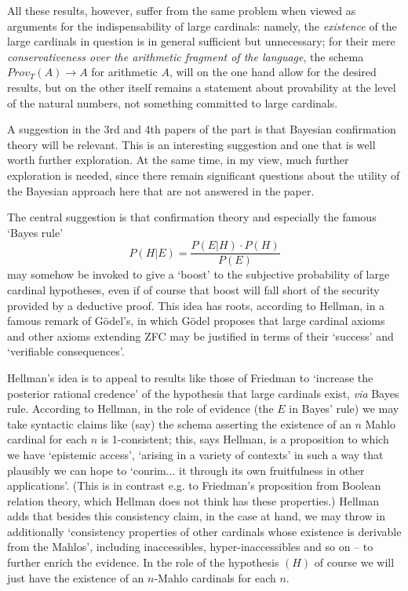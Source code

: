 \documentclass{asl}
\theoremstyle{definition}
\begin{document}
All these results, however, suffer from the same problem when viewed as arguments for the indispensability of large cardinals: namely, the \emph{existence} of the large cardinals in question is in general sufficient but unnecessary; for their mere \emph{conservativeness over the arithmetic fragment of the language}, the schema $Prov_T(A) \rightarrow A$ for arithmetic $A$, will on the one hand allow for the desired results, but on the other itself remains a statement about provability at the level of the natural numbers, not something committed to large cardinals.

A suggestion in the 3rd and 4th papers of the part is that Bayesian confirmation 
theory will be relevant. This is an interesting suggestion and one that is
 well worth further exploration. At the same time, in my view, 
 much further exploration is needed, since there remain significant 
 questions about the utility of the Bayesian approach here that are 
 not answered in the paper.

The central suggestion is that confirmation theory and especially the 
famous `Bayes rule'
\begin{equation}
P(H|E) = \frac{P(E|H)\cdot P(H)}{P(E)}
\end{equation}
may somehow be invoked to give a `boost' to the subjective probability 
of large cardinal hypotheses, even if of course that boost will fall 
short of the security provided by a deductive proof. 
This idea has roots, according to Hellman, in a famous remark of G\"odel's, 
in which G\"odel proposes that large cardinal axioms and other axioms 
extending ZFC may be justified in terms of their `success' and 
`verifiable consequences'.

Hellman's idea is to appeal to results like those of Friedman 
to `increase the posterior rational credence' of the hypothesis that large 
cardinals exist, \emph{via}  Bayes rule. According to Hellman, 
in the role of evidence (the $E$ in Bayes' rule) we may take syntactic 
claims like (say) the schema asserting the existence of an $n$ Mahlo cardinal 
for each $n$ is 1-consistent; this, says Hellman, is a proposition to which 
we have `epistemic access', `arising in a variety of contexts' in such a way that
plausibly we can hope to `conrim... it through its own fruitfulness in other applications'.
(This is in contrast e.g. to Friedman's proposition from Boolean relation theory,
which Hellman does not think has these properties.) Hellman adds that besides this
consistency claim, in the case at hand, we may throw in additionally `consistency 
properties of other cardinals whose existence is derivable from the Mahlos', 
including inaccessibles, hyper-inaccessibles and so on -- 
to further enrich the evidence. In the role of the hypothesis $(H)$ of course
we will just have the existence of an $n$-Mahlo cardinals for each $n$. 
\end{document}
